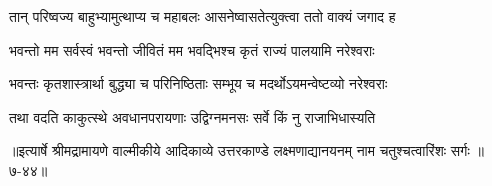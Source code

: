 \twolineshloka
{तान् परिष्वज्य बाहुभ्यामुत्थाप्य च महाबलः}
{आसनेष्वासतेत्युक्त्वा ततो वाक्यं जगाद ह} %

\twolineshloka
{भवन्तो मम सर्वस्वं भवन्तो जीवितं मम}
{भवद्भिश्च कृतं राज्यं पालयामि नरेश्वराः} %

\twolineshloka
{भवन्तः कृतशास्त्रार्था बुद्ध्या च परिनिष्ठिताः}
{सम्भूय च मदर्थोऽयमन्वेष्टव्यो नरेश्वराः} %

\twolineshloka
{तथा वदति काकुत्स्थे अवधानपरायणाः}
{उद्विग्नमनसः सर्वे किं नु राजाभिधास्यति} %


॥इत्यार्षे श्रीमद्रामायणे वाल्मीकीये आदिकाव्ये उत्तरकाण्डे लक्ष्मणाद्यानयनम् नाम चतुश्चत्वारिंशः सर्गः ॥७-४४॥
